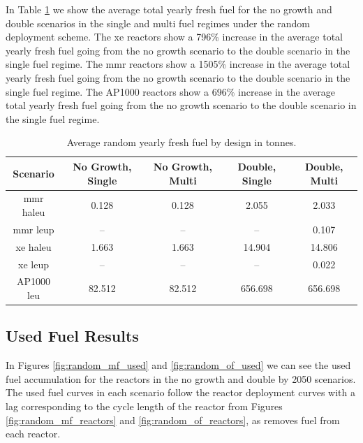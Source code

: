 In Table \ref{tab:random_fresh_avg} we show the average total yearly fresh fuel for the no growth and double scenarios in the single and multi fuel regimes under the random deployment scheme. The \gls{xe} reactors show a 796\% increase in the average total yearly fresh fuel going from the no growth scenario to the double scenario in the single fuel regime. The \gls{mmr} reactors show a 1505\% increase in the average total yearly fresh fuel going from the no growth scenario to the double scenario in the single fuel regime. The AP1000 reactors show a 696\% increase in the average total yearly fresh fuel going from the no growth scenario to the double scenario in the single fuel regime.

\begin{table}[H]
    \centering
    \caption{Average random yearly fresh fuel by design in tonnes.}
    \label{tab:random_fresh_avg}
    \begin{tabular}{c c c c c}
       \hline
       Scenario & No Growth, Single & No Growth, Multi & Double, Single & Double, Multi  \\
       \hline
       \gls{mmr} \gls{haleu}   & 0.128    & 0.128   & 2.055    & 2.033    \\
       \gls{mmr} \gls{leup}    & --       & --      & --       & 0.107    \\
       \gls{xe} \gls{haleu}    & 1.663    & 1.663   & 14.904   & 14.806   \\
       \gls{xe} \gls{leup}     & --       & --      & --       & 0.022    \\
       AP1000 \gls{leu}        & 82.512   & 82.512  & 656.698  & 656.698  \\
       \hline
    \end{tabular}
\end{table}





\subsection{Used Fuel Results}
\label{sec:random_used}

In Figures \ref{fig:random_mf_used} and \ref{fig:random_of_used} we can see the used fuel accumulation for the reactors in the no growth and double by 2050 scenarios. The used fuel curves in each scenario follow the reactor deployment curves with a lag corresponding to the cycle length of the reactor from Figures \ref{fig:random_mf_reactors} and \ref{fig:random_of_reactors}, as \cyclus removes fuel from each reactor.


